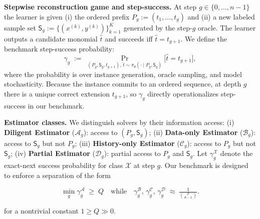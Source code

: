 \documentclass{article}
\begin{document}
{\bf Stepwise reconstruction game and step-success.\enspace}
At step $g\in\{0,\dots,n-1\}$ the learner is given (i) the ordered prefix $P_g:=(t_1,\dots,t_g)$ and
(ii) a new labeled sample set $\mathsf S_g:=\{(x^{(k)},y^{(k)})\}_{k=1}^K$ generated by the step-$g$ oracle.
The learner outputs a candidate monomial $\hat t$ and succeeds iff $\hat t=t_{g+1}$. We define the benchmark step-success probability:
\begin{equation}\label{eq:gamma_exact}
\gamma_g \;:=\; \Pr_{(P_g,\mathsf S_g,t_{g+1}),\,\hat t\sim\pi_\theta(\cdot\mid P_g,\mathsf S_g)}\big[\hat t=t_{g+1}\big],
\end{equation}
where the probability is over instance generation, oracle sampling, and model stochasticity.
Because the instance commits to an ordered sequence, at depth $g$ there is a unique correct extension $t_{g+1}$,
so $\gamma_g$ directly operationalizes step-success in our benchmark.

{\bf Estimator classes.\enspace} We distinguish solvers by their information access: (i) \textbf{Diligent Estimator} ($\mathcal A_g$): access to $(P_g,\mathsf S_g)$; (ii) \textbf{Data-only Estimator} ($\mathcal B_g$): access to $\mathsf S_g$ but not $P_g$; (iii) \textbf{History-only Estimator} ($\mathcal C_g$): access to $P_g$ but not $\mathsf S_g$; (iv) \textbf{Partial Estimator} ($\mathcal D_g$): partial access to  $P_g$ and $\mathsf S_g$.
Let $\gamma_g^{\mathcal X}$ denote the exact-next success probability for class $\mathcal X$ at step $g$. Our benchmark is designed to enforce a separation of the form
\begin{small}
\begin{equation}\label{eq:separation_goal}
\min_g \gamma_g^{\mathcal A} \;\ge\; Q
\quad\text{while}\quad
\gamma_g^{\mathcal B},\,\gamma_g^{\mathcal C},\,\gamma_g^{\mathcal D}
\;\approx\; \tfrac{1}{\binom{p}{d-1}}.
\end{equation}
\end{small}
for a nontrivial constant $1\geq Q \gg 0$.
\end{document}
